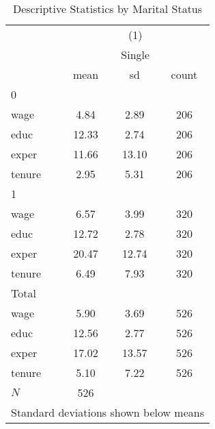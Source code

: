 \begin{table}[htbp]\centering
\def\sym#1{\ifmmode^{#1}\else\(^{#1}\)\fi}
\caption{Descriptive Statistics by Marital Status}
\begin{tabular}{l*{1}{ccc}}
\toprule
            &\multicolumn{3}{c}{(1)}               \\
            &\multicolumn{3}{c}{Single}            \\
            &        mean&          sd&       count\\
\midrule
0           &            &            &            \\
wage        &        4.84&        2.89&         206\\
educ        &       12.33&        2.74&         206\\
exper       &       11.66&       13.10&         206\\
tenure      &        2.95&        5.31&         206\\
\midrule
1           &            &            &            \\
wage        &        6.57&        3.99&         320\\
educ        &       12.72&        2.78&         320\\
exper       &       20.47&       12.74&         320\\
tenure      &        6.49&        7.93&         320\\
\midrule
Total       &            &            &            \\
wage        &        5.90&        3.69&         526\\
educ        &       12.56&        2.77&         526\\
exper       &       17.02&       13.57&         526\\
tenure      &        5.10&        7.22&         526\\
\midrule
\(N\)       &         526&            &            \\
\bottomrule
\multicolumn{4}{l}{\footnotesize Standard deviations shown below means}\\
\end{tabular}
\end{table}

